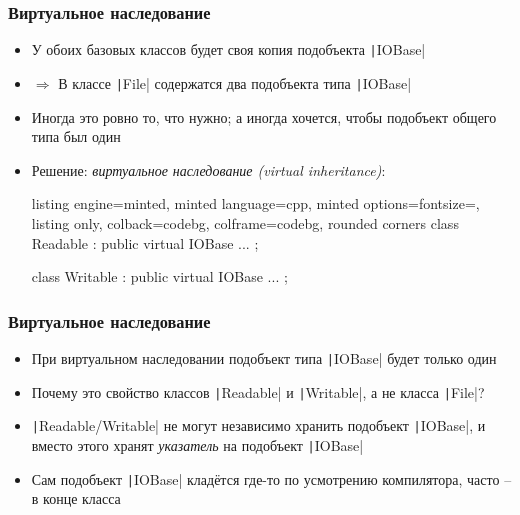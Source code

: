\documentclass[10pt]{beamer}
\begin{document}
\begin{frame}[fragile]
\frametitle{Виртуальное наследование}
\begin{itemize}
\item У обоих базовых классов будет своя копия подобъекта \texttt|IOBase|
\pause
\item \(\Longrightarrow\) В классе \texttt|File| содержатся два подобъекта типа \texttt|IOBase|
\pause
\item Иногда это ровно то, что нужно; а иногда хочется, чтобы подобъект общего типа был один
\pause
\item Решение: \textit{виртуальное наследование (virtual inheritance)}:
\begin{tcblisting}{listing engine=minted, minted language=cpp, minted options={fontsize=\scriptsize}, listing only, colback=codebg, colframe=codebg, rounded corners}
class Readable : public virtual IOBase {
  ...
};

class Writable : public virtual IOBase {
  ...
};
\end{tcblisting}
\end{itemize}
\end{frame}

\begin{frame}[fragile]
\frametitle{Виртуальное наследование}
\begin{itemize}
\item При виртуальном наследовании подобъект типа \texttt|IOBase| будет только один
\pause
\item Почему это свойство классов \texttt|Readable| и \texttt|Writable|, а не класса \texttt|File|?
\pause
\item \texttt|Readable/Writable| не могут независимо хранить подобъект \texttt|IOBase|, и вместо этого хранят \textit{указатель} на подобъект \texttt|IOBase|
\pause
\item Сам подобъект \texttt|IOBase| кладётся где-то по усмотрению компилятора, часто -- в конце класса
\end{itemize}
\end{frame}
\end{document}
